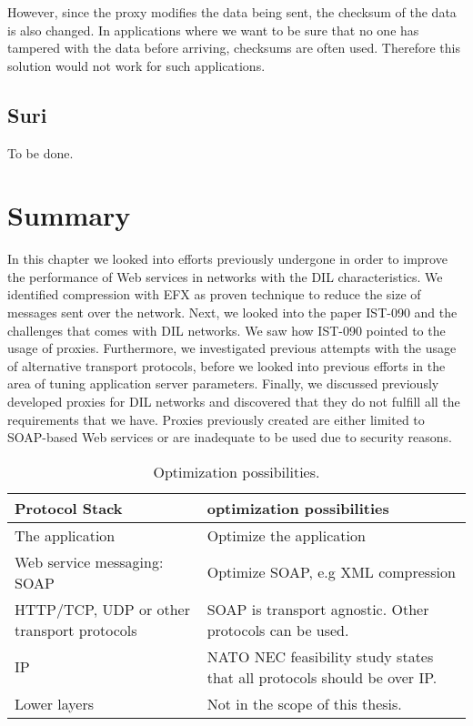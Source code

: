  However, since the proxy modifies the data being sent, the checksum of the data
 is also changed. In applications where we want to be sure that no one has
 tampered with the data before arriving, checksums are often used. Therefore
 this solution would not work for such applications.


\subsection{Suri}
To be done.



\section{Summary}

In this chapter we looked into efforts previously undergone in order to improve
the performance of Web services in networks with the DIL characteristics. We
identified compression with EFX as proven technique to reduce the size of
messages sent over the network. Next, we looked into the paper IST-090 and the
challenges that comes with DIL networks. We saw how IST-090 pointed to the usage
of proxies. Furthermore, we investigated previous attempts with the usage of
alternative transport protocols, before we looked into previous efforts in the
area of tuning application server parameters. Finally, we discussed previously
developed proxies for DIL networks and discovered that they do not fulfill all
the requirements that we have. Proxies previously created are either limited to
SOAP-based Web services or are inadequate to be used due to security reasons.

\begin{table}[h]
\begin{tabularx}{\textwidth}{| X | X |}
\hline
  \textbf{Protocol Stack} & \textbf{optimization possibilities} \\ \hline
  The application & Optimize the application\\ \hline
  Web service messaging: SOAP & Optimize SOAP, e.g XML compression \\ \hline
  HTTP/TCP, UDP or other transport protocols & SOAP is transport agnostic. Other
  protocols can be used. \\ \hline
  IP & NATO NEC feasibility study states that all protocols should be over IP. \\
  \hline
  Lower layers & Not in the scope of this thesis. \\ \hline
\end{tabularx}
\caption{Optimization possibilities.} \label{table:optimalization-overview}
\end{table}
